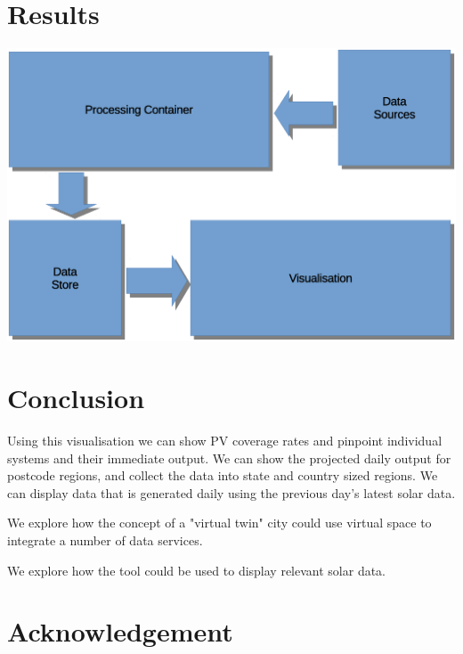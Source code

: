 \documentclass[10pt, a4paper]{article}
\begin{document}
\begin{multicols}{2}



\section{Results}

\includegraphics[scale=0.17]{design1.eps}

\section{Conclusion}

Using this visualisation we can show PV coverage rates and pinpoint individual systems and their immediate output. We can show the projected daily output for postcode regions, and collect the data into state and country sized regions. We can display data that is generated daily using the previous day's latest solar data. 

We explore how the concept of a "virtual twin" city could use virtual space to integrate a number of data services.

We explore how the tool could be used to display relevant solar data.

\section*{Acknowledgement}


%
\end{multicols}
\end{document}
